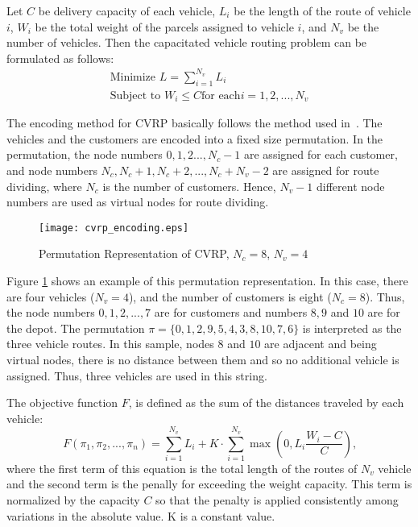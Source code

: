 Let $C$ be delivery capacity of each vehicle, $L_i$ be the length of the route of vehicle $i$, $W_i$ be the total weight of the parcels assigned to vehicle $i$, and $N_v$ be the number of vehicles. Then the capacitated vehicle routing problem can be formulated as follows:
\begin{eqnarray*}
    \text{Minimize } L=\sum_{i=1}^{N_v}{L_i} \\
    \text{Subject to } W_i \leq C \text{for each} i = 1,2,...,N_v
\end{eqnarray*}

The encoding method for CVRP basically follows the method used in~\citep{tsutsui2004solving}. The vehicles and the customers are encoded into a fixed size permutation. In the permutation, the node numbers $0,1,2...,N_c-1$ are assigned for each customer, and node numbers $N_c, N_c+1, N_c+2,...,N_c+N_v-2$ are assigned for route dividing, where $N_c$ is the number of customers. Hence, $N_v-1$ different node numbers are used as virtual nodes for route dividing.

\begin{figure}[t]
    \centering
    \texttt{[image: cvrp\_encoding.eps]}
    \caption{Permutation Representation of CVRP, $N_c = 8$, $N_v = 4$}
	\label{fig:cvrp_encoding}
\end{figure}

Figure \ref{fig:cvrp_encoding} shows an example of this permutation representation. In this case, there are four vehicles ($N_v = 4$), and the number of customers is eight ($N_c =8$). Thus, the node numbers $0,1,2,...,7$ are for customers and numbers $8,9$ and $10$ are for the depot. The permutation $\pi = \{ 0,1,2,9,5,4,3,8,10,7,6 \}$ is interpreted as the three vehicle routes. In  this  sample, nodes $8$ and $10$ are adjacent and being virtual nodes, there is no distance between them and so no additional vehicle is assigned. Thus, three vehicles are used in this string. 

The objective function $F$, is defined as the sum of the distances traveled by each vehicle:
\begin{equation*}
	F(\pi_1, \pi_2, ... , \pi_n) = \sum_{i=1}^{N_v}{L_i} + K\cdot\sum_{i=1}^{N_v}{ \max{(0,L_i\frac{W_i-C}{C})}} \text{,}
\end{equation*}
where the first term of this equation is the total length of the routes of $N_v$ vehicle  and the second term is the penally for exceeding the weight capacity. This term is normalized by the capacity $C$ so that the penalty is applied consistently among variations in the absolute value. K is a constant value.


